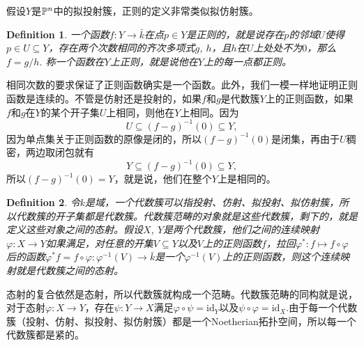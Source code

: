 \documentclass[9pt]{extarticle}
\theoremstyle{plain}%
\newtheorem{defi}{Definition}[section]%
\begin{document}
假设$Y$是$\mathbb{P}^n$中的拟投射簇，正则的定义非常类似拟仿射簇。
\begin{defi}
	一个函数$f:Y\to \bar{k}$在点$p\in Y$是正则的，就是说存在$p$的邻域$U$使得$p\in U\subseteq Y$，存在两个次数相同的齐次多项式$g$, $h$，且$h$在$U$上处处不为$0$，那么$f=g/h$. 称一个函数在$Y$上正则，就是说他在$Y$上的每一点都正则。
\end{defi}
相同次数的要求保证了正则函数确实是一个函数。此外，我们一模一样地证明正则函数是连续的。不管是仿射还是投射的，如果$f$和$g$是代数簇$Y$上的正则函数，如果$f$和$g$在$Y$的某个开子集$U$上相同，则他在$Y$上相同。因为
\[
	U\subseteq (f-g)^{-1}(0)\subseteq Y,
\]
因为单点集关于正则函数的原像是闭的，所以$(f-g)^{-1}(0)$是闭集，再由于$U$稠密，两边取闭包就有
\[
	Y\subseteq (f-g)^{-1}(0)\subseteq Y,
\]
所以$(f-g)^{-1}(0)=Y$，就是说，他们在整个$Y$上是相同的。
\begin{defi}
令$k$是域，一个代数簇可以指投射、仿射、拟投射、拟仿射簇，所以代数簇的开子集都是代数簇。代数簇范畴的对象就是这些代数簇，剩下的，就是定义这些对象之间的态射。假设$X$, $Y$是两个代数簇，他们之间的连续映射$\varphi:X\to Y$如果满足，对任意的开集$V\subseteq Y$以及$V$上的正则函数$f$，拉回$\varphi^*:f\mapsto f\circ \varphi$后的函数$\varphi^* f=f\circ \varphi:\varphi^{-1}(V)\to \bar{k}$是一个$\varphi^{-1}(V)$上的正则函数，则这个连续映射就是代数簇之间的态射。
\end{defi}
态射的复合依然是态射，所以代数簇就构成一个范畴。代数簇范畴的同构就是说，对于态射$\varphi:X\to Y$，存在$\psi:Y\to X$满足$\varphi\circ \psi=\mathrm{id}_Y$以及$\psi\circ \varphi=\mathrm{id}_X$.由于每一个代数簇（投射、仿射、拟投射、拟仿射簇）都是一个Noetherian拓扑空间，所以每一个代数簇都是紧的。
\end{document}
